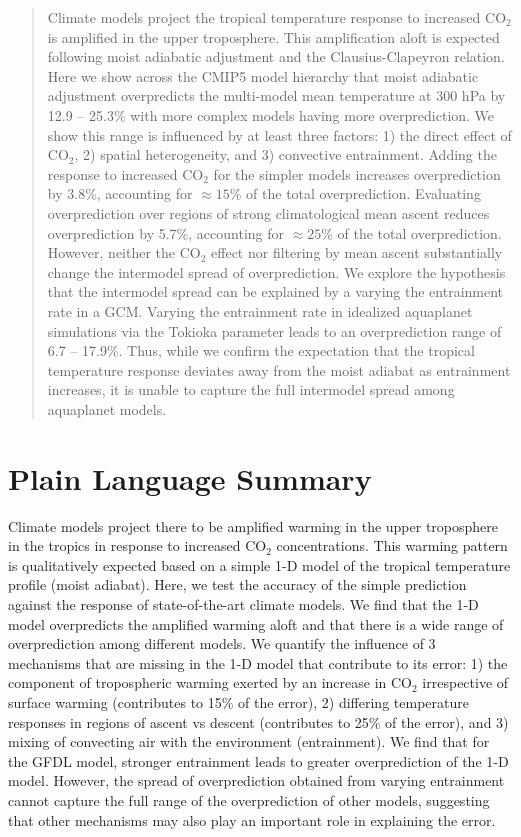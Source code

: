 \documentclass[draft]{agujournal2019}
\begin{document}

\begin{abstract}
Climate models project the tropical temperature response to increased CO$_2$ is amplified in the upper troposphere. This amplification aloft is expected following moist adiabatic adjustment and the Clausius-Clapeyron relation. Here we show across the CMIP5 model hierarchy that moist adiabatic adjustment overpredicts the multi-model mean temperature at 300 hPa by 12.9 -- 25.3\% with more complex models having more overprediction. We show this range is influenced by at least three factors: 1) the direct effect of CO$_2$, 2) spatial heterogeneity, and 3) convective entrainment. Adding the response to increased CO$_2$ for the simpler models increases overprediction by 3.8\%, accounting for $\approx15\%$ of the total overprediction. Evaluating overprediction over regions of strong climatological mean ascent reduces overprediction by 5.7\%, accounting for $\approx25\%$ of the total overprediction. However, neither the CO$_2$ effect nor filtering by mean ascent substantially change the intermodel spread of overprediction. We explore the hypothesis that the intermodel spread can be explained by a varying the entrainment rate in a GCM. Varying the entrainment rate in idealized aquaplanet simulations via the Tokioka parameter leads to an overprediction range of 6.7 -- 17.9\%. Thus, while we confirm the expectation that the tropical temperature response deviates away from the moist adiabat as entrainment increases, it is unable to capture the full intermodel spread among aquaplanet models.
\end{abstract}

\section*{Plain Language Summary}
Climate models project there to be amplified warming in the upper troposphere in the tropics in response to increased CO$_2$ concentrations. This warming pattern is qualitatively expected based on a simple 1-D model of the tropical temperature profile (moist adiabat). Here, we test the accuracy of the simple prediction against the response of state-of-the-art climate models. We find that the 1-D model overpredicts the amplified warming aloft and that there is a wide range of overprediction among different models. We quantify the influence of 3 mechanisms that are missing in the 1-D model that contribute to its error: 1) the component of tropospheric warming exerted by an increase in CO$_2$ irrespective of surface warming (contributes to 15\% of the error), 2) differing temperature responses in regions of ascent vs descent (contributes to 25\% of the error), and 3) mixing of convecting air with the environment (entrainment). We find that for the GFDL model, stronger entrainment leads to greater overprediction of the 1-D model. However, the spread of overprediction obtained from varying entrainment cannot capture the full range of the overprediction of other models, suggesting that other mechanisms may also play an important role in explaining the error.
\end{document}
